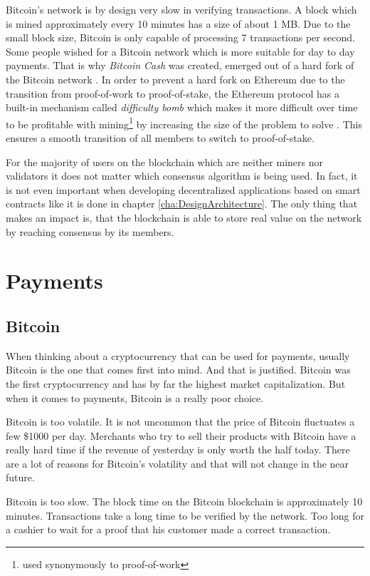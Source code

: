 Bitcoin's network is by design very slow in verifying transactions. A block which is mined approximately every 10 minutes has a size of about 1 MB. Due to the small block size, Bitcoin is only capable of processing 7 transactions per second. Some people wished for a Bitcoin network which is more suitable for day to day payments. That is why \textit{Bitcoin Cash} was created, emerged out of a hard fork of the Bitcoin network \cite{BitcoinCash2020, HillChopraValencourt2018}. In order to prevent a hard fork on Ethereum due to the transition from proof-of-work to proof-of-stake, the Ethereum protocol has a built-in mechanism called \textit{difficulty bomb} which makes it more difficult over time to be profitable with mining\footnote{used synonymously to proof-of-work} by increasing the size of the problem to solve \cite{Wood2020}. This ensures a smooth transition of all members to switch to proof-of-stake.

For the majority of users on the blockchain which are neither miners nor validators it does not matter which consensus algorithm is being used. In fact, it is not even important when developing decentralized applications based on smart contracts like it is done in chapter \ref{cha:DesignArchitecture}. The only thing that makes an impact is, that the blockchain is able to store real value on the network by reaching consensus by its members.

\section{Payments}
\subsection{Bitcoin}
When thinking about a cryptocurrency that can be used for payments, usually Bitcoin is the one that comes first into mind. And that is justified. Bitcoin was the first cryptocurrency and has by far the highest market capitalization. But when it comes to payments, Bitcoin is a really poor choice.

Bitcoin is too volatile. It is not uncommon that the price of Bitcoin fluctuates a few \$1000 per day. Merchants who try to sell their products with Bitcoin have a really hard time if the revenue of yesterday is only worth the half today. There are a lot of reasons for Bitcoin's volatility and that will not change in the near future. 

Bitcoin is too slow. The block time on the Bitcoin blockchain is approximately 10 minutes. Transactions take a long time to be verified by the network. Too long for a cashier to wait for a proof that his customer made a correct transaction.


